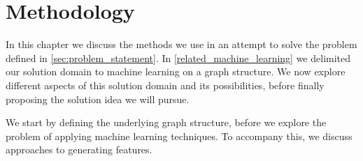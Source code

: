 \chapter{Methodology}\label{chap:analysis}

In this chapter we discuss the methods we use in an attempt to solve the problem defined in \cref{sec:problem_statement}. In \cref{related_machine_learning} we delimited our solution domain to machine learning on a graph structure. We now explore different aspects of this solution domain and its possibilities, before finally proposing the solution idea we will pursue.

We start by defining the underlying graph structure, before we explore the problem of applying machine learning techniques. To accompany this, we discuss approaches to generating features.








